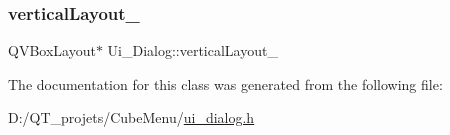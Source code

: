 \subsubsection{\texorpdfstring{vertical\+Layout\+\_}{verticalLayout\_4}}
{\footnotesize\ttfamily Q\+V\+Box\+Layout$\ast$ Ui\+\_\+\+Dialog\+::vertical\+Layout\+\_}



The documentation for this class was generated from the following file\+:\begin{DoxyCompactItemize}
\item 
D\+:/\+Q\+T\+\_\+projets/\+Cube\+Menu/\hyperlink{ui__dialog_8h}{ui\+\_\+dialog.\+h}\end{DoxyCompactItemize}
